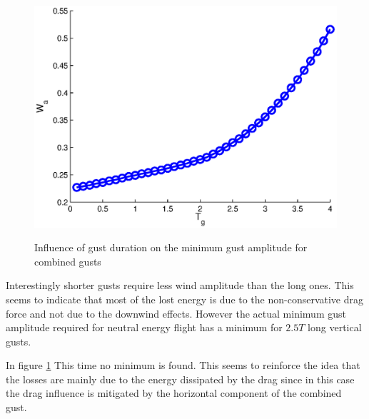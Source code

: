 \begin{figure}[h!]
  \begin{center}
    \scalebox{1.0}
    {\includegraphics{./Figures/Wg_vs_TG_windtype=3_alhpamax=12_nodalphalimit.eps}}
  \end{center}
  \caption{Influence of gust duration on the minimum gust amplitude for combined gusts}
  \label{fig:combined_amplitude_duration}
\end{figure}

\par Interestingly shorter gusts require less wind amplitude than the long ones.
This seems to indicate that most of the lost energy is due to the non-conservative drag force and not due to the downwind effects.
However the actual minimum gust amplitude required for neutral energy flight has a minimum for $2.5T$ long vertical gusts.

\par In figure \ref{fig:combined_amplitude_duration} This time no minimum is found.
This seems to reinforce the idea that the losses are mainly due to the energy dissipated by the drag since in this case the drag influence is mitigated by the horizontal component of the combined gust.

